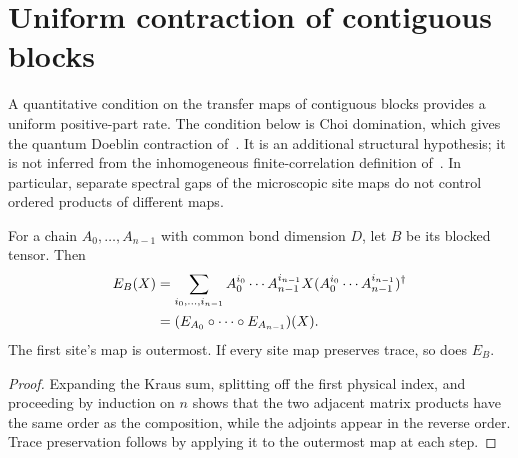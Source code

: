\section{Uniform contraction of contiguous blocks}
\label{sec:ldp_inhomogeneous_contraction}

A quantitative condition on the transfer maps of contiguous blocks
provides a uniform positive-part rate. The condition below is Choi domination,
which gives the quantum Doeblin contraction of~\cite[Theorem~8.17]{Wolf2012Quantum}.
It is an additional structural hypothesis; it is not inferred from the
inhomogeneous finite-correlation definition of~\cite{Malz2024Preparation}.
In particular, separate spectral gaps of the microscopic site maps do not
control ordered products of different maps.

\begin{lemma}
    \label{thm:ldp_chain_transfer_product}
    \leanok
    For a chain $A_0,\dots,A_{n-1}$ with common bond dimension $D$, let $B$
    be its blocked tensor. Then
    \begin{align}
        E_B(X)
         & =\sum_{i_0,\dots,i_{n-1}}
        A_0^{i_0}\cdots A_{n-1}^{i_{n-1}}X
        (A_0^{i_0}\cdots A_{n-1}^{i_{n-1}})^\dagger
        \notag                                        \\
         & =(E_{A_0}\circ\cdots\circ E_{A_{n-1}})(X).
    \end{align}
    The first site's map is outermost. If every site map preserves trace,
    so does $E_B$.
\end{lemma}
\begin{proof}\leanok
    Expanding the Kraus sum, splitting off the first physical index, and
    proceeding by induction on $n$ shows that the two adjacent matrix products
    have the same order as the composition, while the adjoints appear in the
    reverse order. Trace preservation follows by applying it to the outermost
    map at each step.
\end{proof}

